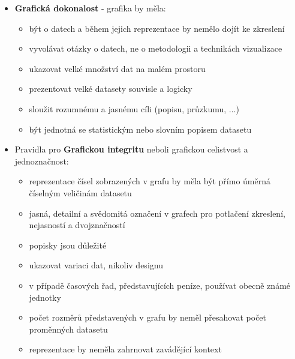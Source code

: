 \documentclass[12pt,]{article}
\providecommand{\tightlist}{%
  \setlength{\itemsep}{0pt}\setlength{\parskip}{0pt}}
\begin{document}
\begin{itemize}
\tightlist
\item
  \textbf{Grafická dokonalost} - grafika by měla:

  \begin{itemize}
  \tightlist
  \item
    být o datech a během jejich reprezentace by nemělo dojít ke
    zkreslení
  \item
    vyvolávat otázky o datech, ne o metodologii a technikách vizualizace
  \item
    ukazovat velké množství dat na malém prostoru
  \item
    prezentovat velké datasety souvisle a logicky
  \item
    sloužit rozumnému a jasnému cíli (popisu, průzkumu, \(\dots\))
  \item
    být jednotná se statistickým nebo slovním popisem datasetu
  \end{itemize}
\end{itemize}

\newpage

\begin{itemize}
\tightlist
\item
  Pravidla pro \textbf{Grafickou integritu} neboli grafickou celistvost
  a jednoznačnost:

  \begin{itemize}
  \tightlist
  \item
    reprezentace čísel zobrazených v grafu by měla být přímo úměrná
    číselným veličinám datasetu
  \item
    jasná, detailní a svědomitá označení v grafech pro potlačení
    zkreslení, nejasností a dvojznačností
  \item
    popisky jsou důležité
  \item
    ukazovat variaci dat, nikoliv designu
  \item
    v případě časových řad, představujících peníze, používat obecně
    známé jednotky
  \item
    počet rozměrů představených v grafu by neměl přesahovat počet
    proměnných datasetu
  \item
    reprezentace by neměla zahrnovat zavádějící kontext
  \end{itemize}
\end{itemize}
\end{document}
